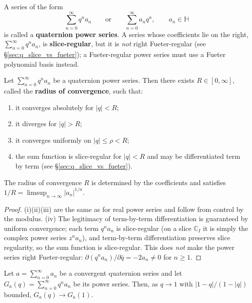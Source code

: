 \begin{definition}\label{def:q_power_series}
A series of the form
\[
\sum_{n=0}^\infty q^n a_n \qquad\text{or}\qquad \sum_{n=0}^\infty a_n q^n,\qquad a_n\in\mathbb{H}
\]
is called a \textbf{quaternion power series}. A series whose coefficients lie on the right, $\sum_{n=0}^\infty q^n a_n$, is \textbf{slice-regular}, but it is \emph{not} right Fueter-regular (see \S\ref{sec:q_slice_vs_fueter}); a Fueter-regular power series must use a Fueter polynomial basis instead.
\end{definition}

\begin{theorem}\label{thm:q_power_series_convergence}
Let $\sum_{n=0}^\infty q^n a_n$ be a quaternion power series. Then there exists $R\in[0,\infty]$, called the \textbf{radius of convergence}, such that:
\begin{enumerate}[label=(\roman*)]
    \item it converges absolutely for $|q|<R$;
    \item it diverges for $|q|>R$;
    \item it converges uniformly on $|q|\le \rho<R$;
    \item the sum function is slice-regular for $|q|<R$ and may be differentiated term by term (see \S\ref{sec:q_slice_vs_fueter}).
\end{enumerate}
The radius of convergence $R$ is determined by the coefficients and satisfies $1/R=\limsup_{n\to\infty}|a_n|^{1/n}$.
\end{theorem}

\begin{proof}
(i)(ii)(iii) are the same as for real power series and follow from control by the modulus. (iv) The legitimacy of term-by-term differentiation is guaranteed by uniform convergence; each term $q^n a_n$ is slice-regular (on a slice $\mathbb{C}_I$ it is simply the complex power series $z^n a_n$), and term-by-term differentiation preserves slice regularity, so the sum function is slice-regular. This does \emph{not} make the power series right Fueter-regular: $\partial(q^n a_n)/\partial\bar q=-2a_n\neq 0$ for $n\ge 1$.
\end{proof}

\begin{theorem}\label{thm:q_abel}
Let $a=\sum_{n=0}^\infty a_n$ be a convergent quaternion series and let $G_a(q)=\sum_{n=0}^\infty q^n a_n$ be its power series. Then, as $q\to 1$ with $|1-q|/(1-|q|)$ bounded, $G_a(q)\to G_a(1)$.
\end{theorem}

